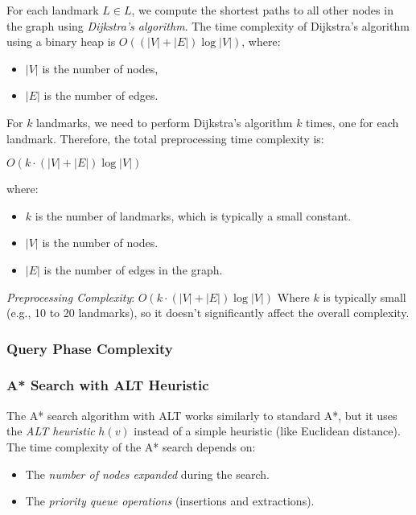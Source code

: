 \begin{appendices}
	For each landmark $ L \in \textit{L} $, we compute the shortest paths to all other nodes in the graph using \textit{Dijkstra's algorithm}. The time complexity of Dijkstra’s algorithm using a binary heap is $ O((|V| + |E|) \log |V|) $, where:
	\begin{itemize}
		\item $ |V| $ is the number of nodes,
		\item $ |E| $ is the number of edges.
	\end{itemize}
	
	For $ k $ landmarks, we need to perform Dijkstra’s algorithm $ k $ times, one for each landmark. Therefore, the total preprocessing time complexity is:
	
	$
	O(k \cdot (|V| + |E|) \log |V|)
	$
	
	where:
	\begin{itemize}
		\item $ k $ is the number of landmarks, which is typically a small constant.
		\item $|V| $ is the number of nodes.
		\item $ |E| $ is the number of edges in the graph.
	\end{itemize}
	
	\textit{Preprocessing Complexity}:  
	$
	O(k \cdot (|V| + |E|) \log |V|)
	$
	Where $ k $ is typically small (e.g., 10 to 20 landmarks), so it doesn’t significantly affect the overall complexity.
	
	\subsubsection{Query Phase Complexity}
	
	\subsubsection{A* Search with ALT Heuristic}
	
	The A* search algorithm with ALT works similarly to standard A*, but it uses the \textit{ALT heuristic} $ h(v) $ instead of a simple heuristic (like Euclidean distance). The time complexity of the A* search depends on:
	\begin{itemize}
		\item The \textit{number of nodes expanded} during the search.
		\item The \textit{priority queue operations} (insertions and extractions).
	\end{itemize}
	

\end{appendices}
